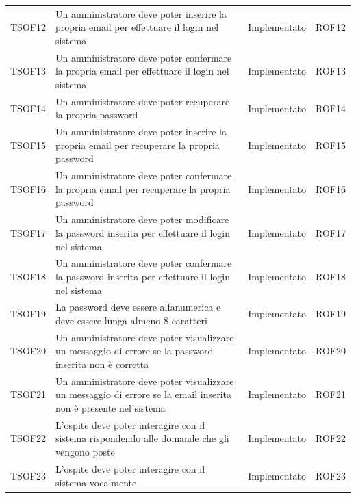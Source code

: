 \documentclass[../PianoDiQualifica_v4.0.0.tex]{subfiles}
\begin{document}
\begin{longtable}[c] { >{\centering\arraybackslash}p{2cm} p{7cm} >{\centering\arraybackslash}p{4cm} >{\centering\arraybackslash}p{2cm}}
			\addlinespace[0.3em]
			\midrule
			\addlinespace[0.3em]
			TSOF12 & Un amministratore deve poter inserire la propria email per effettuare il login nel sistema & Implementato & ROF12 \\
			\addlinespace[0.3em]
			\midrule
			\addlinespace[0.3em]
			TSOF13 & Un amministratore deve poter confermare la propria email per effettuare il login nel sistema & Implementato & ROF13 \\
			\addlinespace[0.3em]
			\midrule
			\addlinespace[0.3em]
			TSOF14 & Un amministratore deve poter recuperare la propria password & Implementato & ROF14 \\
			\addlinespace[0.3em]
			\midrule
			\addlinespace[0.3em]
			TSOF15 & Un amministratore deve poter inserire la propria email per recuperare la propria password & Implementato & ROF15 \\
			\addlinespace[0.3em]
			\midrule
			\addlinespace[0.3em]
			TSOF16 & Un amministratore deve poter confermare la propria email per recuperare la propria password & Implementato & ROF16 \\
			\addlinespace[0.3em]
			\midrule
			\addlinespace[0.3em]
			TSOF17 & Un amministratore deve poter modificare la password inserita per effettuare il login nel sistema	& Implementato & ROF17 \\
			\addlinespace[0.3em]
			\midrule
			\addlinespace[0.3em]
			TSOF18 & Un amministratore deve poter confermare la password inserita per effettuare il login nel sistema & Implementato & ROF18 \\
			\addlinespace[0.3em]
			\midrule
			\addlinespace[0.3em]
			TSOF19 & La password deve essere alfanumerica e deve essere lunga almeno 8 caratteri & Implementato & ROF19 \\
			\addlinespace[0.3em]
			\midrule
			\addlinespace[0.3em]
			TSOF20 & Un amministratore deve poter visualizzare un messaggio di errore se la password inserita non è corretta & Implementato & ROF20 \\
			\addlinespace[0.3em]
			\midrule
			\addlinespace[0.3em]
			TSOF21 & Un amministratore deve poter visualizzare un messaggio di errore se la email inserita non è presente nel sistema & Implementato & ROF21 \\
			\addlinespace[0.3em]
			\midrule
			\addlinespace[0.3em]
			TSOF22 & L'ospite deve poter interagire con il sistema rispondendo alle domande che gli vengono poste & Implementato & ROF22 \\
			\addlinespace[0.3em]
			\midrule
			\addlinespace[0.3em]
			TSOF23 & L'ospite deve poter interagire con il sistema vocalmente & Implementato & ROF23 \\

\end{longtable}
\end{document}
